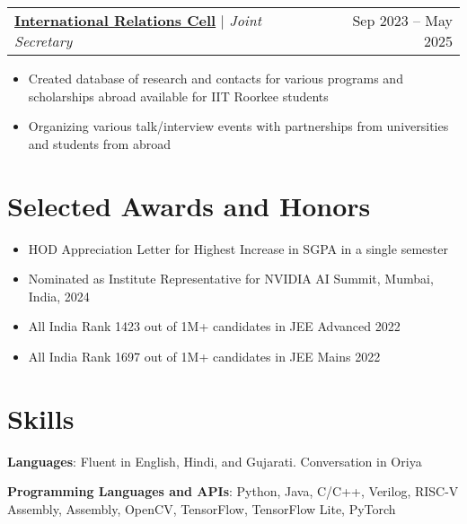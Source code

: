 \documentclass[letterpaper,11pt]{article}
\makeatletter
\newcommand{\resumeItem}[1]{
  \item\small{
    {#1 \vspace{-2pt}}
  }
}
\newcommand{\resumeProjectHeading}[2]{
    \item
    \begin{tabular*}{0.97\textwidth}{l@{\extracolsep{\fill}}r}
      \small#1 & \small#2 \\
    \end{tabular*}\vspace{-7pt}
}
\newcommand{\resumeSubHeadingListEnd}{\end{itemize}}
\newcommand{\resumeItemListStart}{\begin{itemize}}
\newcommand{\resumeItemListEnd}{\end{itemize}\vspace{-9pt}}
\makeatother
\begin{document}
      \resumeProjectHeading
          {\textbf{\href{https://ir.iitr.ac.in/HomePage}{International Relations Cell}} $|$ \emph{Joint Secretary}}
          {Sep 2023 -- May 2025}
          \resumeItemListStart
            \resumeItem{Created database of research and contacts for various programs and scholarships abroad available for IIT Roorkee students}
            \resumeItem{Organizing various talk/interview events with partnerships from universities and students from abroad}
          \resumeItemListEnd
          

\section{Selected Awards and Honors}
 \begin{itemize}[leftmargin=0.15in, label={}]
\setlength\itemsep{0.02in}
    \resumeItem{{
     {HOD Appreciation Letter for Highest Increase in SGPA in a single semester}
    }}
    \resumeItem{{
     {Nominated as Institute Representative for NVIDIA AI Summit, Mumbai, India, 2024}
    }}
    \resumeItem{{
     {All India Rank 1423 out of 1M+ candidates in JEE Advanced 2022}
    }}
    \resumeItem{{
     {All India Rank 1697 out of 1M+ candidates in JEE Mains 2022}
    }}
 \end{itemize}

\section{Skills}
 \begin{itemize}[leftmargin=0.15in, label={}]
 \setlength\itemsep{-0.03in}
    \small{\item{
     \textbf{Languages}{: Fluent in English, Hindi, and Gujarati. Conversation in Oriya}
    }}
    \small{\item{
     \textbf{Programming Languages and APIs}{: Python, Java, C/C++, Verilog, RISC-V Assembly, Assembly, OpenCV, TensorFlow, TensorFlow Lite, PyTorch}
    }}
 \end{itemize}

\end{document}

